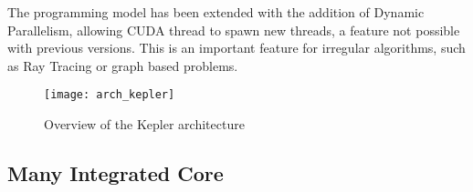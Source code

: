\documentclass[main.tex]{subfiles}
\begin{document}
The programming model has been extended with the addition of Dynamic Parallelism, allowing \acs{CUDA} thread to spawn new threads, a feature not possible with previous versions. This is an important feature for irregular algorithms, such as Ray Tracing or graph based problems.

\begin{figure}
  \centering
  \texttt{[image: arch\_kepler]}
  \caption{Overview of the Kepler architecture \label{fig:kepler}}
\end{figure}



\subsection{\intel Many Integrated Core}
\end{document}
